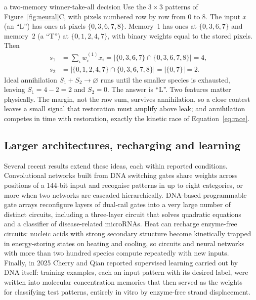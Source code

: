 \begin{Worked}{a two-memory winner-take-all decision}
Use the $3\times3$ patterns of Figure~\ref{fig:neural}C, with pixels numbered row
by row from $0$ to $8$. The input $x$ (an ``L'') has ones at pixels
$\{0,3,6,7,8\}$. Memory~1 has ones at $\{0,3,6,7\}$ and memory~2 (a ``T'') at
$\{0,1,2,4,7\}$, with binary weights equal to the stored pixels. Then
\[
\begin{aligned}
s_1&=\textstyle\sum_iw^{(1)}_ix_i=|\{0,3,6,7\}\cap\{0,3,6,7,8\}|=4,\\
s_2&=|\{0,1,2,4,7\}\cap\{0,3,6,7,8\}|=|\{0,7\}|=2 .
\end{aligned}
\]
Ideal annihilation $S_1+S_2\to\varnothing$ runs until the smaller species is
exhausted, leaving $S_1=4-2=2$ and $S_2=0$. The answer is ``L''. Two features
matter physically. The margin, not the raw sum, survives annihilation, so a
close contest leaves a small signal that restoration must amplify above leak;
and annihilation competes in time with restoration, exactly the kinetic race of
Equation~\eqref{eq:race}.
\end{Worked}

\subsection{Larger architectures, recharging and learning}
Several recent results extend these ideas, each within reported conditions.
Convolutional networks built from DNA switching gates share weights across
positions of a 144-bit input and recognise patterns in up to eight categories,
or more when two networks are cascaded hierarchically.\cite{Xiong2022}
DNA-based programmable gate arrays reconfigure layers of dual-rail gates into a
very large number of distinct circuits, including a three-layer circuit that
solves quadratic equations and a classifier of disease-related
microRNAs.\cite{Lv2023} Heat can recharge enzyme-free circuits: nucleic acids
with strong secondary structure become kinetically trapped in energy-storing
states on heating and cooling, so circuits and neural networks with more than
two hundred species compute repeatedly with new inputs.\cite{SongQian2025}
Finally, in 2025 Cherry and Qian reported supervised learning carried out by
DNA itself: training examples, each an input pattern with its desired label,
were written into molecular concentration memories that then served as the
weights for classifying test patterns, entirely in vitro by enzyme-free strand
displacement.\cite{CherryQian2025}

